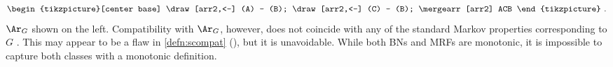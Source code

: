 \begin{subappendices}
{\[\begin{tikzpicture}[center base]
        \draw[arr2,<-] (A) -- (B);
        \draw[arr2,<-] (C) -- (B);
        \mergearr[arr2] ACB
    \end{tikzpicture}
    ~.
\]
}
$\Ar_G$ shown on the left.
% 
Compatibility
with $\Ar_G$, however, does not coincide with any of the standard Markov properties
corresponding to $G$ \citep{koller2009probabilistic}.
%
This may appear to be a flaw in \cref{defn:scompat} (\scibility), but it is unavoidable.  
While both BNs and MRFs are monotonic, it is impossible to capture both classes with a monotonic definition.


\end{subappendices}
